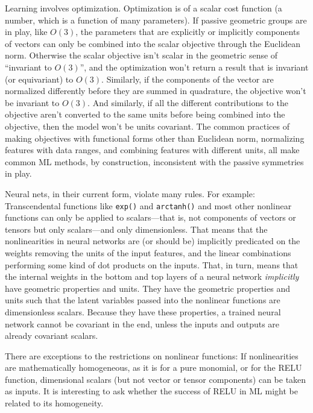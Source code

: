 \documentclass[preprint]{article} %
\begin{document}
Learning involves optimization.
Optimization is of a scalar cost function (a number, which is a function of many parameters).
If passive geometric groups are in play, like $O(3)$, the parameters that are explicitly or implicitly components of vectors can only be combined into the scalar objective through the Euclidean norm. Otherwise the scalar objective isn't scalar in the geometric sense of ``invariant to $O(3)$'', and the optimization won't return a result that is invariant (or equivariant) to $O(3)$.
Similarly, if the components of the vector are normalized differently before they are summed in quadrature, the objective won't be invariant to $O(3)$.
And similarly, if all the different contributions to the objective aren't converted to the same units before being combined into the objective, then the model won't be units covariant.
The common practices of making objectives with functional forms other than Euclidean norm, normalizing features with data ranges, and combining features with different units, all make common ML methods, by construction, inconsistent with the passive symmetries in play.

Neural nets, in their current form, violate many rules. For example:
Transcendental functions like \texttt{exp()} and \texttt{arctanh()} and most other nonlinear functions can only be applied to scalars---that is, not components of vectors or tensors but only scalars---and only dimensionless.
That means that the nonlinearities in neural networks are (or should be) implicitly predicated on the weights removing the units of the input features, and the linear combinations performing some kind of dot products on the inputs.
That, in turn, means that the internal weights in the bottom and top layers of a neural network \emph{implicitly} have geometric properties and units.
They have the geometric properties and units such that the latent variables passed into the nonlinear functions are dimensionless scalars.
Because they have these properties, a trained neural network cannot be covariant in the end, unless the inputs and outputs are already covariant scalars.

There are exceptions to the restrictions on nonlinear functions:
If nonlinearities are mathematically homogeneous, as it is for a pure monomial, or for the RELU function, dimensional scalars (but not vector or tensor components) can be taken as inputs.
It is interesting to ask whether the success of RELU in ML might be related to its homogeneity.
\end{document}
